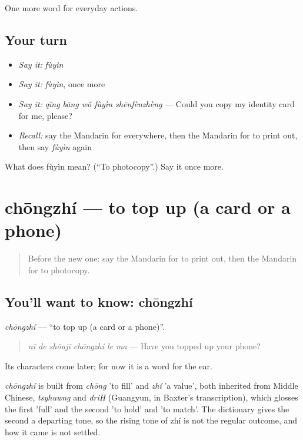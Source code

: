 \begin{grammarlens}[title={What you've built}]
One more word for everyday actions.
\end{grammarlens}

\subsection*{Your turn}
\begin{itemize}
\raggedright
  \item \emph{Say it:} \emph{fùyìn}
  \item \emph{Say it:} \emph{fùyìn}, once more
  \item \emph{Say it:} \emph{qǐng bāng wǒ fùyìn shēnfènzhèng} — Could you copy my identity card for me, please?
  \item \emph{Recall:} say the Mandarin for everywhere, then the Mandarin for to print out, then say \emph{fùyìn} again
\end{itemize}

\begin{tcolorbox}[breakable,colback=teal!4,colframe=teal!35!black,title={Before you move on}]
What does fùyìn mean? (\textquotedblleft{}To photocopy\textquotedblright{}.) Say it once more.
\end{tcolorbox}
\section[chōngzhí]{chōngzhí — to top up (a card or a phone)}

\label{lesson:ZH-C212-chongzhi}



\begin{quote}
Before the new one: say the Mandarin for to print out, then the Mandarin for to photocopy.
\end{quote}

\subsection*{You'll want to know: chōngzhí}
\emph{chōngzhí} — \textquotedblleft{}to top up (a card or a phone)\textquotedblright{}.

\begin{quote}
\emph{nǐ de shǒujī chōngzhí le ma} — Have you topped up your phone?
\end{quote}

Its characters come later; for now it is a word for the ear.

\begin{cousinweb}
\emph{chōngzhí} is built from \emph{chōng} 'to fill' and \emph{zhí} 'a value', both inherited from Middle Chinese, \emph{tsyhuwng} and \emph{driH} (Guangyun, in Baxter's transcription), which glosses the first 'full' and the second 'to hold' and 'to match'. The dictionary gives the second a departing tone, so the rising tone of zhí is not the regular outcome, and how it came is not settled.
\end{cousinweb}

